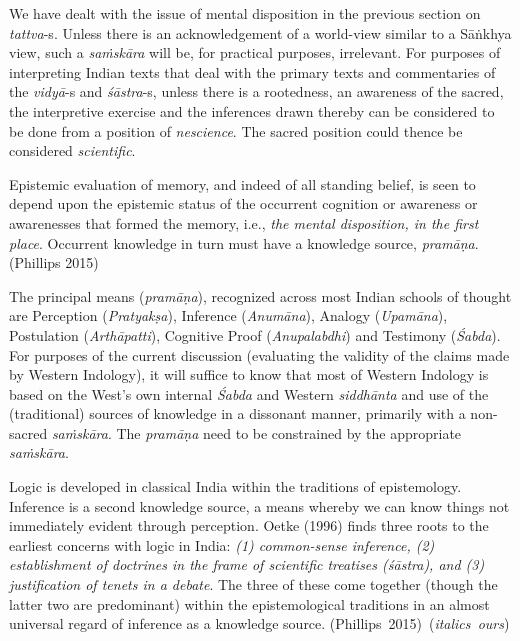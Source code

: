 We have dealt with the issue of mental disposition in the previous section on {\sl tattva}-s. Unless there is an acknowledgement of a world-view similar to a Sāṅkhya view, such a {\sl saṁskāra} will be, for practical purposes, irrelevant. For purposes of interpreting Indian texts that deal with the primary texts and commentaries of the {\sl vidyā}-s and {\sl śāstra}-s, unless there is a rootedness, an awareness of the sacred, the interpretive exercise and the inferences drawn thereby can be considered to be done from a position of {\sl nescience}. The sacred position could thence be considered {\sl scientific}.
\begin{myquote}
Epistemic evaluation of memory, and indeed of all standing belief, is seen to depend upon the epistemic status of the occurrent cognition or awareness or awarenesses that formed the memory, i.e., {\sl the mental disposition, in the first place}. Occurrent knowledge in turn must have a knowledge source, {\sl pramāṇa}.\hfill (Phillips 2015)
\end{myquote}

The principal means ({\sl pramāṇa}), recognized across most Indian schools of thought are Perception ({\sl Pratyakṣa}), Inference ({\sl Anumāna}), Analogy ({\sl Upamāna}), Postulation ({\sl Arthāpatti}), Cognitive Proof ({\sl Anupalabdhi}) and Testimony ({\sl Śabda}). For purposes of the current discussion (evaluating the validity of the claims made by Western Indology), it will suffice to know that most of Western Indology is based on the West's own internal {\sl Śabda} and Western {\sl siddhānta} and use of the (traditional) sources of knowledge in a dissonant manner,  primarily with a non-sacred {\sl saṁ\-skāra}. The {\sl pramāṇa} need to be constrained by the appropriate {\sl saṁskāra}.
\begin{myquote}
Logic is developed in classical India within the traditions of epistemology. Inference is a second knowledge source, a means whereby we can know things not immediately evident through perception. Oetke (1996) finds three roots to the earliest concerns with logic in India: {\sl (1) common-sense inference, (2) establishment of doctrines in the frame of scientific treatises (\sl śāstra\relax), and (3) justification of tenets in a debate}. The three of these come together (though the latter two are predominant) within the epistemological traditions in an almost universal regard of inference as a knowledge source. 
\hfill \hbox{(Phillips 2015) ({\sl italics ours})}
\end{myquote}

